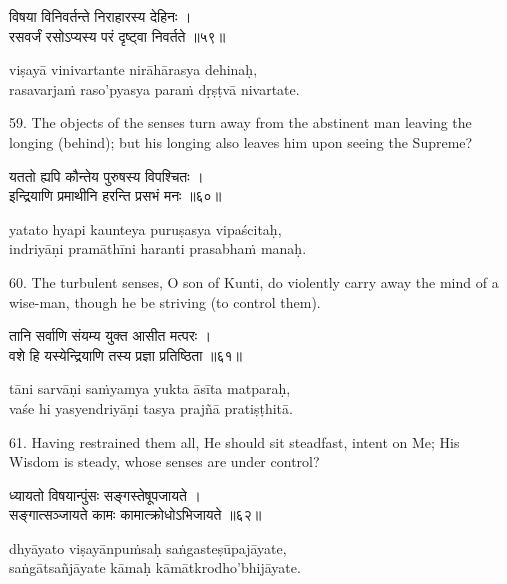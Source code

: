 \begin{gitaverse}
विषया विनिवर्तन्ते निराहारस्य देहिनः । \\
रसवर्जं रसोऽप्यस्य परं दृष्ट्वा निवर्तते ॥५९॥
\end{gitaverse}

\begin{transliteration}
viṣayā vinivartante nirāhārasya dehinaḥ, \\
rasavarjaṁ raso'pyasya paraṁ dṛṣṭvā nivartate.
\end{transliteration}

59. The objects of the senses turn away from the abstinent man leaving the
longing (behind); but his longing also leaves him upon seeing the Supreme?

\begin{gitaverse}
यततो ह्यपि कौन्तेय पुरुषस्य विपश्चितः । \\
इन्द्रियाणि प्रमाथीनि हरन्ति प्रसभं मनः ॥६०॥
\end{gitaverse}

\begin{transliteration}
yatato hyapi kaunteya puruṣasya vipaścitaḥ, \\
indriyāṇi pramāthīni haranti prasabhaṁ manaḥ.
\end{transliteration}

60. The turbulent senses, O son of Kunti, do violently carry away the mind of a
wise-man, though he be striving (to control them).

\begin{gitaverse}
तानि सर्वाणि संयम्य युक्त आसीत मत्परः । \\
वशे हि यस्येन्द्रियाणि तस्य प्रज्ञा प्रतिष्ठिता ॥६१॥
\end{gitaverse}

\begin{transliteration}
tāni sarvāṇi saṁyamya yukta āsīta matparaḥ, \\
vaśe hi yasyendriyāṇi tasya prajñā pratiṣṭhitā.
\end{transliteration}

61. Having restrained them all, He should sit steadfast, intent on Me; His
Wisdom is steady, whose senses are under control?

\begin{gitaverse}
ध्यायतो विषयान्पुंसः सङ्गस्तेषूपजायते । \\
सङ्गात्सञ्जायते कामः कामात्क्रोधोऽभिजायते ॥६२॥
\end{gitaverse}

\begin{transliteration}
dhyāyato viṣayānpuṁsaḥ saṅgasteṣūpajāyate, \\
saṅgātsañjāyate kāmaḥ kāmātkrodho'bhijāyate.
\end{transliteration}

